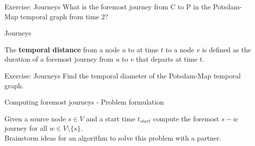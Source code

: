 \documentclass{beamer}
\begin{document}
\begin{frame}{Exercise: Journeys}
  \large \centering
  What is the foremost journey from C to P in the Potsdam-Map temporal graph from time $2$?\\
\end{frame}

\begin{frame}{Journeys}
	\begin{tcolorbox}[title=Definition: Temporal distance]
    The \textbf{temporal distance} from a node $u$ to at time $t$ to a node $v$ is defined as the duration of a foremost journey from $u$ to $v$ that departs at time $t$.
	\end{tcolorbox}
\end{frame}

\begin{frame}{Exercise: Journeys}
  \large \centering
  Find the temporal diameter of the Potsdam-Map temporal graph.\\
\end{frame}


\begin{frame}[label=foremost_journey_problem_formulation]{Computing foremost journeys - Problem formulation}
  \begin{center}
    Given a source node $s \in V$ and a start time $t_{start}$ compute the foremost $s-w$ journey for all $w \in V \text{\textbackslash{}} \{ s \}$. \\[2ex]
    Brainstorm ideas for an algorithm to solve this problem with a partner.
  \end{center}
\end{frame}
\end{document}
